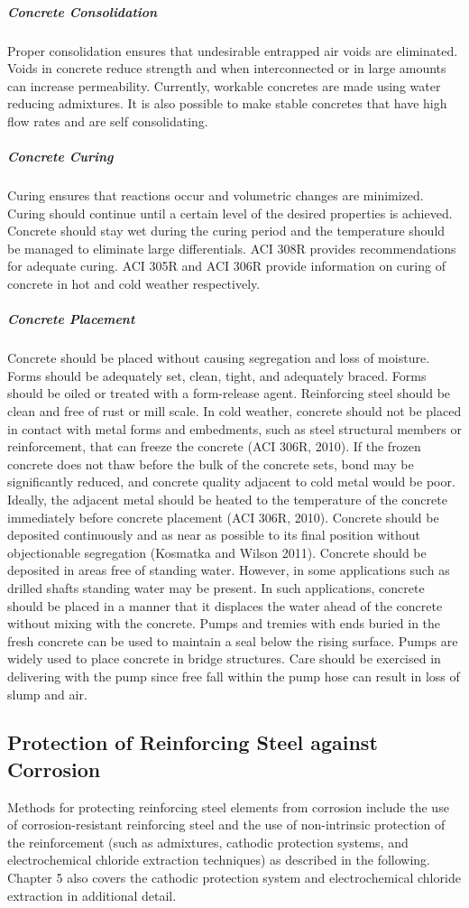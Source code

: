 \subparagraph{Concrete Consolidation}
Proper consolidation ensures that undesirable entrapped air voids are eliminated. Voids in concrete reduce
strength and when interconnected or in large amounts can increase permeability. Currently, workable concretes are
made using water reducing admixtures. It is also possible to make stable concretes that have high flow rates and are
self consolidating.

\subparagraph{Concrete Curing}

Curing ensures that reactions occur and volumetric changes are minimized. Curing should continue until a
certain level of the desired properties is achieved. Concrete should stay wet during the curing period and the
temperature should be managed to eliminate large differentials. ACI 308R provides recommendations for adequate
curing. ACI 305R and ACI 306R provide information on curing of concrete in hot and cold weather respectively.

\subparagraph{Concrete Placement}
Concrete should be placed without causing segregation and loss of moisture. Forms should be adequately set,
clean, tight, and adequately braced. Forms should be oiled or treated with a form-release agent. Reinforcing steel
should be clean and free of rust or mill scale. In cold weather, concrete should not be placed in contact with metal
forms and embedments, such as steel structural members or reinforcement, that can freeze the concrete (ACI 306R,
2010). If the frozen concrete does not thaw before the bulk of the concrete sets, bond may be significantly reduced,
and concrete quality adjacent to cold metal would be poor. Ideally, the adjacent metal should be heated to the
temperature of the concrete immediately before concrete placement (ACI 306R, 2010). Concrete should be deposited
continuously and as near as possible to its final position without objectionable segregation (Kosmatka and Wilson
2011). Concrete should be deposited in areas free of standing water. However, in some applications such as drilled
shafts standing water may be present. In such applications, concrete should be placed in a manner that it displaces
the water ahead of the concrete without mixing with the concrete. Pumps and tremies with ends buried in the fresh
concrete can be used to maintain a seal below the rising surface. Pumps are widely used to place concrete in bridge
structures. Care should be exercised in delivering with the pump since free fall within the pump hose can result in
loss of slump and air.


\subsection{Protection of Reinforcing Steel against Corrosion}\label{subsec:protection-reinforcing-steel}
Methods for protecting reinforcing steel elements from corrosion include the use of corrosion-resistant
reinforcing steel and the use of non-intrinsic protection of the reinforcement (such as admixtures, cathodic protection
systems, and electrochemical chloride extraction techniques) as described in the following. Chapter 5 also covers the
cathodic protection system and electrochemical chloride extraction in additional detail.

